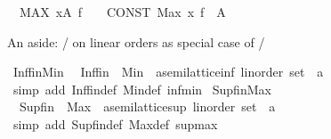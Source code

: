 \begin{isabellebody}
\ \ {\isachardoublequoteopen}MAX\ x{\isasymin}A{\isachardot}{\kern0pt}\ f{\isachardoublequoteclose}\ \ \ {\isasymrightleftharpoons}\ {\isachardoublequoteopen}CONST\ Max\ {\isacharparenleft}{\kern0pt}{\isacharparenleft}{\kern0pt}{\isasymlambda}x{\isachardot}{\kern0pt}\ f{\isacharparenright}{\kern0pt}\ {\isacharbackquote}{\kern0pt}\ A{\isacharparenright}{\kern0pt}{\isachardoublequoteclose}%
\begin{isamarkuptext}%
An aside: / on linear orders as special case of /%
\end{isamarkuptext}\isamarkuptrue%
\isamarkupfalse%
\ Inf{\isacharunderscore}{\kern0pt}fin{\isacharunderscore}{\kern0pt}Min{\isacharcolon}{\kern0pt}\isanewline
\ \ {\isachardoublequoteopen}Inf{\isacharunderscore}{\kern0pt}fin\ {\isacharequal}{\kern0pt}\ {\isacharparenleft}{\kern0pt}Min\ {\isacharcolon}{\kern0pt}{\isacharcolon}{\kern0pt}\ {\isacharprime}{\kern0pt}a{\isacharcolon}{\kern0pt}{\isacharcolon}{\kern0pt}{\isacharbraceleft}{\kern0pt}semilattice{\isacharunderscore}{\kern0pt}inf{\isacharcomma}{\kern0pt}\ linorder{\isacharbraceright}{\kern0pt}\ set\ {\isasymRightarrow}\ {\isacharprime}{\kern0pt}a{\isacharparenright}{\kern0pt}{\isachardoublequoteclose}\isanewline
%
\isadelimproof
\ \ %
\endisadelimproof
%
\isatagproof
{}\isamarkupfalse%
\ {\isacharparenleft}{\kern0pt}simp\ add{\isacharcolon}{\kern0pt}\ Inf{\isacharunderscore}{\kern0pt}fin{\isacharunderscore}{\kern0pt}def\ Min{\isacharunderscore}{\kern0pt}def\ inf{\isacharunderscore}{\kern0pt}min{\isacharparenright}{\kern0pt}%
\endisatagproof
{\isafoldproof}%
%
\isadelimproof
\isanewline
%
\endisadelimproof
\isanewline
{}\isamarkupfalse%
\ Sup{\isacharunderscore}{\kern0pt}fin{\isacharunderscore}{\kern0pt}Max{\isacharcolon}{\kern0pt}\isanewline
\ \ {\isachardoublequoteopen}Sup{\isacharunderscore}{\kern0pt}fin\ {\isacharequal}{\kern0pt}\ {\isacharparenleft}{\kern0pt}Max\ {\isacharcolon}{\kern0pt}{\isacharcolon}{\kern0pt}\ {\isacharprime}{\kern0pt}a{\isacharcolon}{\kern0pt}{\isacharcolon}{\kern0pt}{\isacharbraceleft}{\kern0pt}semilattice{\isacharunderscore}{\kern0pt}sup{\isacharcomma}{\kern0pt}\ linorder{\isacharbraceright}{\kern0pt}\ set\ {\isasymRightarrow}\ {\isacharprime}{\kern0pt}a{\isacharparenright}{\kern0pt}{\isachardoublequoteclose}\isanewline
%
\isadelimproof
\ \ %
\endisadelimproof
%
\isatagproof
{}\isamarkupfalse%
\ {\isacharparenleft}{\kern0pt}simp\ add{\isacharcolon}{\kern0pt}\ Sup{\isacharunderscore}{\kern0pt}fin{\isacharunderscore}{\kern0pt}def\ Max{\isacharunderscore}{\kern0pt}def\ sup{\isacharunderscore}{\kern0pt}max{\isacharparenright}{\kern0pt}%

\end{isabellebody}
